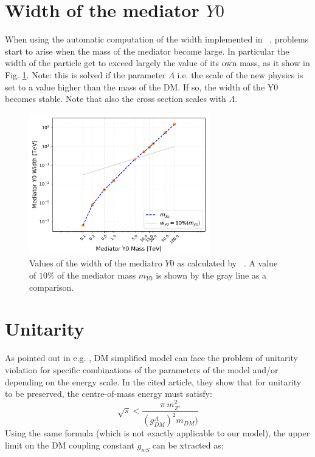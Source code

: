 \documentclass[epj,nopacs,fleqn]{svjour}
\begin{document}
\section{Width of the mediator $Y0$ }
When using the automatic computation of the width implemented in \MG~, problems start to arise when the mass of the mediator become large. In particular the width of the particle get to exceed largely the value of its own mass, as it show in Fig. \ref{width}.
Note: this is solved if the parameter $\Lambda$ i.e. the scale of the new physics is set to a value higher than the mass of the DM.
If so, the width of the Y0 becomes stable.
Note that also the cross section scales with $\Lambda$.

\begin{figure}[!h]
	\centering
	\includegraphics[width=0.7\textwidth]{Fig/Widths_check.pdf}

	\caption{Values of the width of the mediatro $Y0$ as calculated by \MG~. A value of $10\%$ of the mediator mass $m_{Y0}$ is shown by the gray line as a comparison.}
	\label{width}
\end{figure}


\clearpage
\section{Unitarity}

As pointed out in e.g. \cite{Kahlhoefer:2015bea}, DM simplified model can face the problem of unitarity violation for specific combinations of the parameters of the model and/or depending on the energy scale. In the cited article, they show that for unitarity to be preserved, the centre-of-mass energy must satisfy:
\begin{equation}
\sqrt{s} < \frac{\pi \ m^2 _{Z'}}{(g^A_{DM})^2 m_{DM})} 
\end{equation}
Using the same formula (which is not exactly applicable to our model), the upper limit on the DM coupling constant $g_{wS}$ can be xtracted as:
\end{document}
